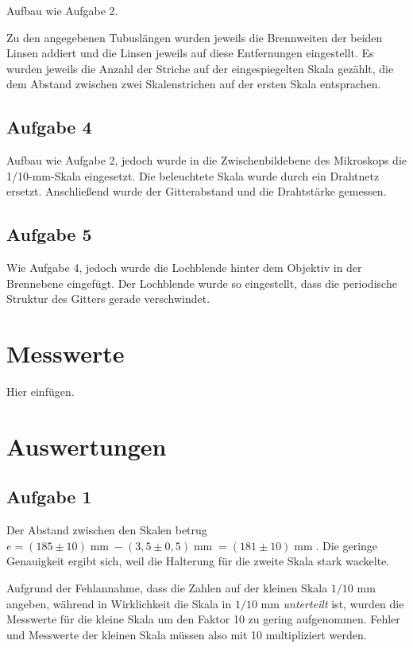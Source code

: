 \documentclass[a4paper,german,12pt,smallheadings]{scrartcl}
\begin{document}
Aufbau wie Aufgabe 2.

Zu den angegebenen Tubuslängen wurden jeweils die Brennweiten der beiden Linsen
addiert und die Linsen jeweils auf diese Entfernungen eingestellt. Es wurden
jeweils die Anzahl der Striche auf der eingespiegelten Skala gezählt, die dem
Abstand zwischen zwei Skalenstrichen auf der ersten Skala entsprachen.

\subsection{Aufgabe 4}

Aufbau wie Aufgabe 2, jedoch wurde in die Zwischenbildebene des Mikroskops die
1/10-mm-Skala eingesetzt. Die beleuchtete Skala wurde durch ein Drahtnetz
ersetzt. Anschließend wurde der Gitterabstand und die Drahtstärke gemessen.

\subsection{Aufgabe 5}

Wie Aufgabe 4, jedoch wurde die Lochblende hinter dem Objektiv in der
Brennebene eingefügt. Der Lochblende wurde so eingestellt, dass die periodische
Struktur des Gitters gerade verschwindet.

\section{Messwerte}
Hier einfügen.

\section{Auswertungen}
\subsection{Aufgabe 1}

Der Abstand zwischen den Skalen betrug $e = (185\pm10) \operatorname{mm} -
(3{,}5\pm0{,}5) \operatorname{mm} = (181\pm10) \operatorname{mm}$. Die geringe
Genauigkeit ergibt sich, weil die Halterung für die zweite Skala stark wackelte.

Aufgrund der Fehlannahme, dass die Zahlen auf der kleinen Skala $1/10$ mm
angeben, während in Wirklichkeit die Skala in $1/10$ mm \textit{unterteilt}
ist, wurden die Messwerte für die kleine Skala um den Faktor 10 zu gering
aufgenommen. Fehler und Messwerte der kleinen Skala müssen also mit 10
multipliziert werden.
\end{document}
